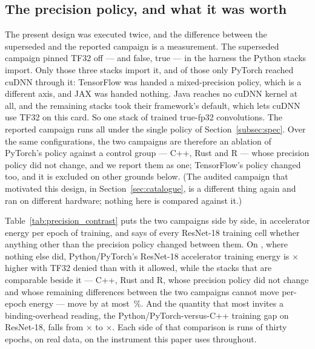 \subsection{The precision policy, and what it was worth}
\label{app:tf32}

The present design was executed twice, and the difference between the
superseded and the reported campaign is a measurement. The superseded campaign
pinned TF32 off ---  and
 false,  true --- in the
harness the Python stacks import. Only those three stacks import it, and of
those only PyTorch reached cuDNN through it: TensorFlow was handed a
mixed-precision policy, which is a different axis, and JAX was handed nothing.
Java reaches no cuDNN kernel at all, and the remaining stacks took their
framework's default, which lets cuDNN use TF32 on this card. So one stack of
\vEcosystems{} trained true-fp32 convolutions. The reported campaign runs all
\vEcosystems{} under the single policy of Section~\ref{subsec:spec}. Over the
same \vConfigurations{} configurations, the two campaigns are therefore an
ablation of PyTorch's policy against a control group --- C++, Rust and R ---
whose precision policy did not change, and we report them as one; TensorFlow's
policy changed too, and it is excluded on other grounds below. (The audited campaign that
motivated this design, in Section~\ref{sec:catalogue}, is a different thing again
and ran on different hardware; nothing here is compared against it.)

Table~\ref{tab:precision_contrast} puts the two campaigns side by side, in
accelerator energy per epoch of training, and says of every ResNet-18 training cell whether anything
other than the precision policy changed between them. On
\vPrecisionGapDataset{}, where nothing else did, Python/PyTorch's ResNet-18
accelerator training energy is \vPrecisionPytorchRatioMin$\times$ higher with TF32 denied
than with it allowed, while the \vPrecisionControlStacks{} stacks that are
comparable beside it --- C++, Rust and R, whose precision policy did not change
and whose remaining differences between the two campaigns cannot move per-epoch
energy --- move by at most \vPrecisionOthersMaxChangePct\,\%. And the
quantity that most invites a binding-overhead reading, the
Python/PyTorch-versus-C++ training gap on ResNet-18, falls from
\vPrecisionGapBefore$\times$ to \vPrecisionGapAfter$\times$. Each side of that
comparison is \vRepetitions{} runs of thirty epochs, on real data, on the
instrument this paper uses throughout.

